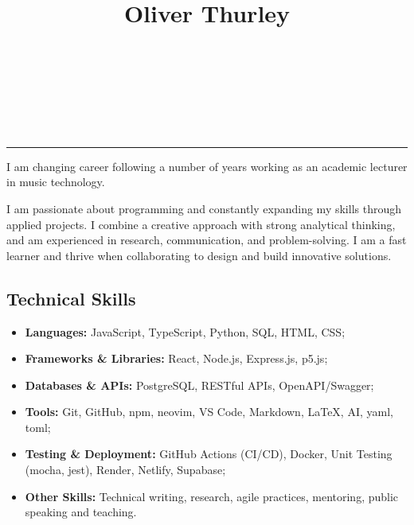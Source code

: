 \documentclass[10pt,a4paper]{article}
\title{{\huge Oliver Thurley}{\raggedright}}
\author{}
\date{}
\makeatletter
\renewcommand{\maketitle}{\bgroup\setlength{\parindent}{0pt}
\begin{flushleft}
  \normalfont{\@title}
  \@author
\end{flushleft}\egroup
}
\providecommand{\tightlist}{%
  \setlength{\itemsep}{0pt}\setlength{\parskip}{0pt}}
\makeatother
\begin{document}
\maketitle

\vspace{0.5em}
\noindent\href{mailto:o.thrly@gmail.com}{} \\%
{} \\%
\href{https://thrly.com}{} \\%
\href{https://github.com/thrly}{} \\%
\href{https://linkedin.com/in/oliver-thurley}{}

\vspace{0.75em}
\noindent\rule{\textwidth}{0.5pt}

I am changing career following a number of years working as an academic
lecturer in music technology.

I am passionate about programming and constantly expanding my skills
through applied projects. I combine a creative approach with strong
analytical thinking, and am experienced in research, communication, and
problem-solving. I am a fast learner and thrive when collaborating to
design and build innovative solutions.

\subsection{Technical Skills}\label{technical-skills}

\begin{itemize}
\tightlist
\item
  \textbf{Languages:} JavaScript, TypeScript, Python, SQL, HTML, CSS;
\item
  \textbf{Frameworks \& Libraries:} React, Node.js, Express.js, p5.js;
\item
  \textbf{Databases \& APIs:} PostgreSQL, RESTful APIs, OpenAPI/Swagger;
\item
  \textbf{Tools:} Git, GitHub, npm, neovim, VS Code, Markdown, LaTeX,
  AI, yaml, toml;
\item
  \textbf{Testing \& Deployment:} GitHub Actions (CI/CD), Docker, Unit
  Testing (mocha, jest), Render, Netlify, Supabase;
\item
  \textbf{Other Skills:} Technical writing, research, agile practices,
  mentoring, public speaking and teaching.
\end{itemize}
\end{document}
